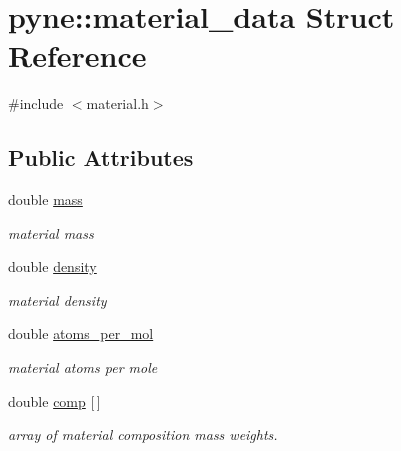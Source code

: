 \hypertarget{structpyne_1_1material__data}{\section{pyne\-:\-:material\-\_\-data Struct Reference}
\label{structpyne_1_1material__data}
}


{\ttfamily \#include $<$material.\-h$>$}

\subsection*{Public Attributes}
\begin{DoxyCompactItemize}
\item 
\hypertarget{structpyne_1_1material__data_a8e5fa2bf074f5c7770fcefca825640b9}{double \hyperlink{structpyne_1_1material__data_a8e5fa2bf074f5c7770fcefca825640b9}{mass}}\label{structpyne_1_1material__data_a8e5fa2bf074f5c7770fcefca825640b9}

\begin{DoxyCompactList}\small\item\em material mass \end{DoxyCompactList}\item 
\hypertarget{structpyne_1_1material__data_adf19d9e0612f5ea9c6093ad09c63eee4}{double \hyperlink{structpyne_1_1material__data_adf19d9e0612f5ea9c6093ad09c63eee4}{density}}\label{structpyne_1_1material__data_adf19d9e0612f5ea9c6093ad09c63eee4}

\begin{DoxyCompactList}\small\item\em material density \end{DoxyCompactList}\item 
\hypertarget{structpyne_1_1material__data_a135b69d35e0bc6c49a025a24cb153798}{double \hyperlink{structpyne_1_1material__data_a135b69d35e0bc6c49a025a24cb153798}{atoms\-\_\-per\-\_\-mol}}\label{structpyne_1_1material__data_a135b69d35e0bc6c49a025a24cb153798}

\begin{DoxyCompactList}\small\item\em material atoms per mole \end{DoxyCompactList}\item 
\hypertarget{structpyne_1_1material__data_a5fc15bdb605f1bcfc07bf0e84fd98289}{double \hyperlink{structpyne_1_1material__data_a5fc15bdb605f1bcfc07bf0e84fd98289}{comp} \mbox{[}$\,$\mbox{]}}\label{structpyne_1_1material__data_a5fc15bdb605f1bcfc07bf0e84fd98289}

\begin{DoxyCompactList}\small\item\em array of material composition mass weights. \end{DoxyCompactList}\end{DoxyCompactItemize}


